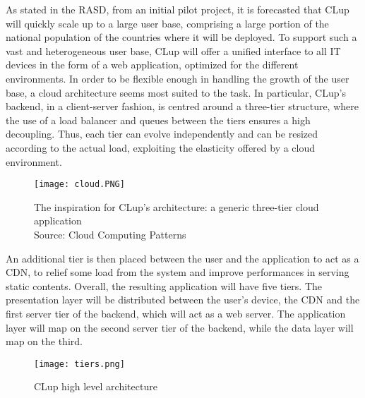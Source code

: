 \documentclass[../../main.tex]{subfiles}
\begin{document}
As stated in the RASD, from an initial pilot project, it is forecasted that CLup will quickly scale up to a large user base, 
comprising a large portion of the national population of the countries where it will be deployed. 
To support such a vast and heterogeneous user base, 
CLup will offer a unified interface to all IT devices in the form of a web application, optimized for the different environments.
In order to be flexible enough in handling the growth of the user base, a cloud architecture seems most suited to the task. 
In particular, CLup's backend, in a client-server fashion, is centred around a three-tier structure, where the use of a load balancer 
and queues between the tiers ensures a high decoupling. 
Thus, each tier can evolve independently and can be resized according to the actual load, 
exploiting the elasticity offered by a cloud environment.

\begin{figure}[H]
    \centering
    \texttt{[image: cloud.PNG]}
    \caption{
        The inspiration for CLup's architecture: a generic three-tier cloud application\\
        Source: Cloud Computing Patterns
    }
\end{figure}

An additional tier is then placed between the user and the application to act as a CDN, to relief some load from the system and improve performances in serving static contents. Overall,
 the resulting application will have five tiers.
The presentation layer will be distributed between the user's device, the CDN and the first server tier of the backend, which will act as a web server. The application layer will map on the second server tier of the backend, while the data layer will map on the third.


\begin{figure}[H]
    \centering
    \texttt{[image: tiers.png]}
    \caption{
        CLup high level architecture
    }
\end{figure}
\end{document}
